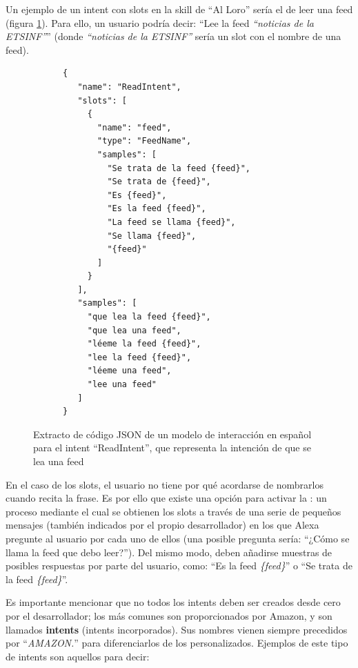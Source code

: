 \documentclass[11pt,spanish,listoffigures,listoftables,table,hyphens,dvipsnames]{tfgetsinf}
\newcommand{\fe}[1]{\foreign{english}{#1}}
\begin{document}
Un ejemplo de un intent con slots en la skill de ``Al Loro'' sería el de leer una feed (figura \ref{figura:interaction-model-readintent}). Para ello, un usuario podría decir: ``Lee la feed \textit{``noticias de la ETSINF''}'' (donde \textit{``noticias de la ETSINF''} sería un slot con el nombre de una feed).

\begin{figure}[ht]
   \centering
   \begin{verbatim}
      {
         "name": "ReadIntent",
         "slots": [
           {
             "name": "feed",
             "type": "FeedName",
             "samples": [
               "Se trata de la feed {feed}",
               "Se trata de {feed}",
               "Es {feed}",
               "Es la feed {feed}",
               "La feed se llama {feed}",
               "Se llama {feed}",
               "{feed}"
             ]
           }
         ],
         "samples": [
           "que lea la feed {feed}",
           "que lea una feed",
           "léeme la feed {feed}",
           "lee la feed {feed}",
           "léeme una feed",
           "lee una feed"
         ]
      }
   \end{verbatim}
   \caption[Extracto de código JSON de un modelo de interacción en español]{Extracto de código JSON de un modelo de interacción en español para el intent ``ReadIntent'', que representa la intención de que se lea una feed}
   \label{figura:interaction-model-readintent}
\end{figure}

En el caso de los slots, el usuario no tiene por qué acordarse de nombrarlos cuando recita la frase. Es por ello que existe una opción para activar la \fe{``\textbf{elicitation}''}: un proceso mediante el cual se obtienen los slots a través de una serie de pequeños mensajes (también indicados por el propio desarrollador) en los que Alexa pregunte al usuario por cada uno de ellos (una posible pregunta sería: ``¿Cómo se llama la feed que debo leer?''). Del mismo modo, deben añadirse muestras de posibles respuestas por parte del usuario, como: ``Es la feed \textit{\{feed\}}'' o ``Se trata de la feed \textit{\{feed\}}''.

Es importante mencionar que no todos los intents deben ser creados desde cero por el desarrollador; los más comunes son proporcionados por Amazon, y son llamados \textbf{\fe{built-in} intents} (intents incorporados). Sus nombres vienen siempre precedidos por ``\textit{AMAZON.}'' para diferenciarlos de los personalizados. Ejemplos de este tipo de intents son aquellos para decir: 
\end{document}
